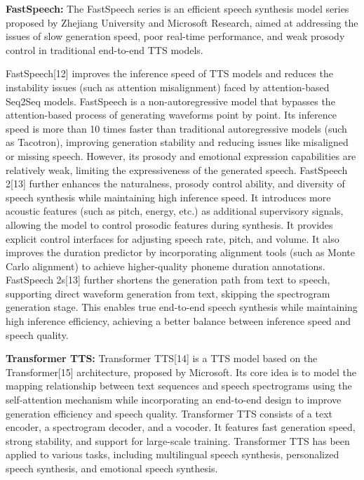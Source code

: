  \textbf{FastSpeech:} The FastSpeech series is an efficient speech synthesis model series proposed by Zhejiang University and Microsoft Research, aimed at addressing the issues of slow generation speed, poor real-time performance, and weak prosody control in traditional end-to-end TTS models.

FastSpeech[12] improves the inference speed of TTS models and reduces the instability issues (such as attention misalignment) faced by attention-based Seq2Seq models. FastSpeech is a non-autoregressive model that bypasses the attention-based process of generating waveforms point by point. Its inference speed is more than 10 times faster than traditional autoregressive models (such as Tacotron), improving generation stability and reducing issues like misaligned or missing speech. However, its prosody and emotional expression capabilities are relatively weak, limiting the expressiveness of the generated speech.
FastSpeech 2[13] further enhances the naturalness, prosody control ability, and diversity of speech synthesis while maintaining high inference speed. It introduces more acoustic features (such as pitch, energy, etc.) as additional supervisory signals, allowing the model to control prosodic features during synthesis. It provides explicit control interfaces for adjusting speech rate, pitch, and volume. It also improves the duration predictor by incorporating alignment tools (such as Monte Carlo alignment) to achieve higher-quality phoneme duration annotations.
FastSpeech 2s[13] further shortens the generation path from text to speech, supporting direct waveform generation from text, skipping the spectrogram generation stage. This enables true end-to-end speech synthesis while maintaining high inference efficiency, achieving a better balance between inference speed and speech quality.

 \textbf{Transformer TTS:} Transformer TTS[14] is a TTS model based on the Transformer[15] architecture, proposed by Microsoft. Its core idea is to model the mapping relationship between text sequences and speech spectrograms using the self-attention mechanism while incorporating an end-to-end design to improve generation efficiency and speech quality.
Transformer TTS consists of a text encoder, a spectrogram decoder, and a vocoder. It features fast generation speed, strong stability, and support for large-scale training. Transformer TTS has been applied to various tasks, including multilingual speech synthesis, personalized speech synthesis, and emotional speech synthesis.

